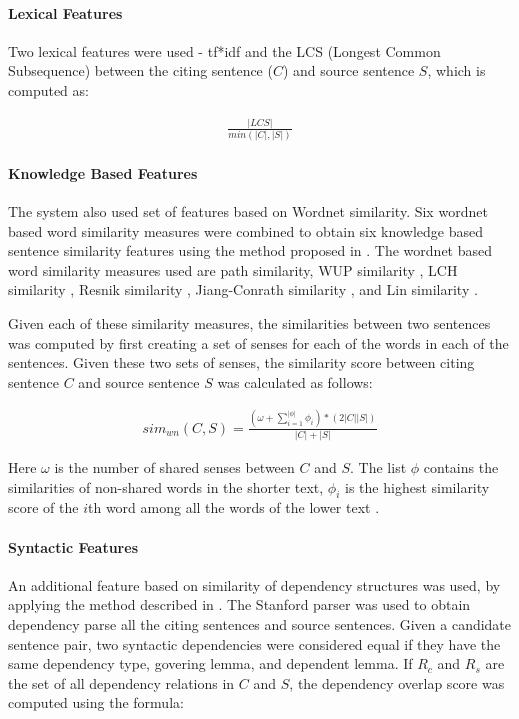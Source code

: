 \documentclass[11pt]{article}
\begin{document}
\paragraph{Lexical Features} Two lexical features were used - tf*idf and the LCS (Longest Common Subsequence) between the citing sentence ($C$) and source sentence $S$, which is computed as:

\begin{eqnarray*}
  \frac{|LCS|}{min(|C|,|S|)}
\end{eqnarray*}

\paragraph{Knowledge Based Features} The system also used set of features based on Wordnet similarity. Six wordnet based word similarity measures were combined to obtain six knowledge based sentence similarity features using the method proposed in \cite{Banea2012}. The wordnet based word similarity measures used are path similarity, WUP similarity \cite{Wu:1994:VSL:981732.981751} , LCH similarity \cite{leacock1998combining}, Resnik similarity \cite{Resnik:1995:UIC:1625855.1625914},  Jiang-Conrath similarity \cite{Jiang97taxonomySimilarity}, and Lin similarity \cite{Lin:1998:IDS:645527.657297}. 

Given each of these similarity measures, the similarities between two sentences was computed by first creating a set of senses for each of the words in each of the sentences. Given these two sets of senses, the similarity score between citing sentence $C$ and source sentence $S$ was calculated as follows:

\begin{eqnarray*}
  sim_{wn}(C,S) = \frac{(\omega + \sum_{i=1}^{|\phi|}\phi_i) * (2|C||S|)}{|C|+|S|}
\end{eqnarray*}

Here $\omega$ is the number of shared senses between $C$ and $S$. The list $\phi$ contains the similarities of non-shared words in the shorter text, $\phi_i$ is the highest similarity score of the $i$th word among all the words of the lower text \cite{S13-1017}. 

\paragraph{Syntactic Features} An additional feature based on similarity of dependency structures was used, by applying the method described in \cite{S13-1017}. The Stanford parser was used to obtain dependency parse all the citing sentences and source sentences. Given a candidate sentence pair, two syntactic dependencies were considered equal if they have the same dependency type, govering lemma, and dependent lemma. If $R_c$ and $R_s$ are the set of all dependency relations in $C$ and $S$, the dependency overlap score was computed using the formula:
\end{document}
